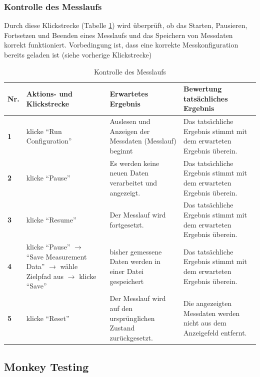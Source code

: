 \documentclass[parskip=full]{scrartcl}
\begin{document}
\subsubsection{Kontrolle des Messlaufs}

Durch diese Klickstrecke (Tabelle \ref{klickMesslauf}) wird überprüft, ob das Starten, Pausieren, Fortsetzen und Beenden eines Messlaufs und das Speichern von Messdaten korrekt funktioniert. Vorbedingung ist, dass eine korrekte Messkonfiguration bereits geladen ist (siehe vorherige Klickstrecke)

\begin{table}[h]
\begin{tabular}{| p{} | p{} | p{} | p{} |}
	\hline
	\textbf{Nr.} & \textbf{Aktions- und Klickstrecke} & \textbf{Erwartetes Ergebnis}  & \textbf{ Bewertung tatsächliches Ergebnis} \\ \hline
	\textbf{1}
	& 
	klicke ``Run Configuration''
	&
	Auslesen und Anzeigen der Messdaten (Messlauf) beginnt
	& 
	Das tatsächliche Ergebnis stimmt mit dem erwarteten Ergebnis überein.
	\\ \hline
	
	\textbf{2}
	& 
	klicke ``Pause''
	&
	Es werden keine neuen Daten verarbeitet und angezeigt.
	& 
	Das tatsächliche Ergebnis stimmt mit dem erwarteten Ergebnis überein.
	\\ \hline
	
	\textbf{3}
	& 
	klicke ``Resume''
	&
	Der Messlauf wird fortgesetzt.
	& 
	Das tatsächliche Ergebnis stimmt mit dem erwarteten Ergebnis überein.
	\\ \hline
	
	\textbf{4}
	& 
	klicke ``Pause'' $\rightarrow$ ``Save Measurement Data'' $\rightarrow$ wähle Zielpfad aus $\rightarrow$ klicke ``Save''
	&
	bisher gemessene Daten werden in einer Datei gespeichert
	& 
	Das tatsächliche Ergebnis stimmt mit dem erwarteten Ergebnis überein.
	\\ \hline
	
	\textbf{5}
	& 
	klicke ``Reset''
	&
	Der Messlauf wird auf den ursprünglichen Zustand zurückgesetzt.
	& 
	Die angezeigten Messdaten werden nicht aus dem Anzeigefeld entfernt.
	\\ \hline
	
\end{tabular}

\caption{Kontrolle des Messlaufs}
\label{klickMesslauf}
\end{table}

\subsection{Monkey Testing}
\end{document}
